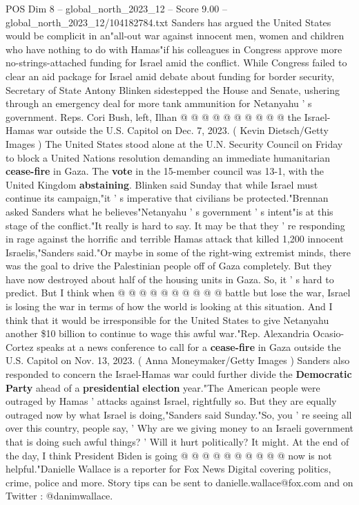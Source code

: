\begin{textsample}{POS Dim 8 – global\_north\_2023\_12 – Score 9.00 – global\_north\_2023\_12/104182784.txt}
Sanders has argued the United States would be complicit in an"all-out war against innocent men, women and children who have nothing to do with Hamas"if his colleagues in Congress approve more no-strings-attached funding for Israel amid the conflict.
While Congress failed to clear an aid package for Israel amid debate about funding for border security, Secretary of State Antony Blinken sidestepped the House and Senate, ushering through an emergency deal for more tank ammunition for Netanyahu ' s government.
Reps.
Cori Bush, left, Ilhan @ @ @ @ @ @ @ @ @ @ the Israel-Hamas war outside the U.S.
Capitol on Dec. 7, 2023. ( Kevin Dietsch/Getty Images ) The United States stood alone at the U.N.
Security Council on Friday to block a United Nations resolution demanding an immediate humanitarian \textbf{cease-fire} in Gaza.
The \textbf{vote} in the 15-member council was 13-1, with the United Kingdom \textbf{abstaining}.
Blinken said Sunday that while Israel must continue its campaign,"it ' s imperative that civilians be protected."Brennan asked Sanders what he believes"Netanyahu ' s government ' s intent"is at this stage of the conflict."It really is hard to say.
It may be that they ' re responding in rage against the horrific and terrible Hamas attack that killed 1,200 innocent Israelis,"Sanders said."Or maybe in some of the right-wing extremist minds, there was the goal to drive the Palestinian people off of Gaza completely.
But they have now destroyed about half of the housing units in Gaza.
So, it ' s hard to predict.
But I think when @ @ @ @ @ @ @ @ @ @ battle but lose the war, Israel is losing the war in terms of how the world is looking at this situation.
And I think that it would be irresponsible for the United States to give Netanyahu another \$10 billion to continue to wage this awful war."Rep.
Alexandria Ocasio-Cortez speaks at a news conference to call for a \textbf{cease-fire} in Gaza outside the U.S.
Capitol on Nov. 13, 2023. ( Anna Moneymaker/Getty Images ) Sanders also responded to concern the Israel-Hamas war could further divide the \textbf{Democratic} \textbf{Party} ahead of a \textbf{presidential} \textbf{election} year."The American people were outraged by Hamas ' attacks against Israel, rightfully so.
But they are equally outraged now by what Israel is doing,"Sanders said Sunday."So, you ' re seeing all over this country, people say, ' Why are we giving money to an Israeli government that is doing such awful things? ' Will it hurt politically?
It might.
At the end of the day, I think President Biden is going @ @ @ @ @ @ @ @ @ @ now is not helpful."Danielle Wallace is a reporter for Fox News Digital covering politics, crime, police and more.
Story tips can be sent to danielle.wallace@fox.com and on Twitter : @danimwallace.

\end{textsample}
